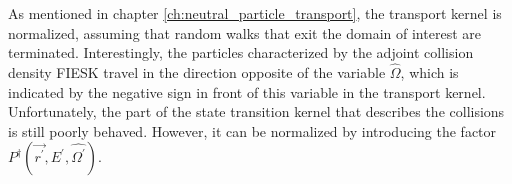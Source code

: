 As mentioned in chapter \ref{ch:neutral_particle_transport}, the transport 
kernel is normalized, assuming that random walks that exit the domain of 
interest are terminated. Interestingly, the particles characterized by the 
adjoint collision density FIESK travel in the direction opposite of the 
variable $\hat{\Omega}$, which is indicated by the negative sign in front of
this variable in the transport kernel. Unfortunately, the part of the state
transition kernel that describes the collisions is still poorly behaved. 
However, it can be normalized by introducing the factor 
$P^{\dagger}(\vec{r^{'}},E^{'},\hat{\Omega^{'}})$.

